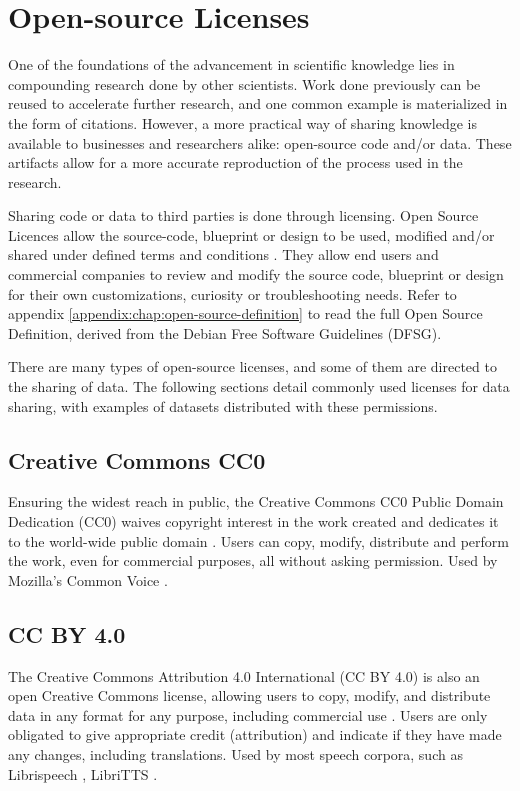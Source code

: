 \section{Open-source Licenses}

One of the foundations of the advancement in scientific knowledge lies in compounding research done by other scientists. Work done previously can be reused to accelerate further research, and one common example is materialized in the form of citations. However, a more practical way of sharing knowledge is available to businesses and researchers alike: open-source code and/or data. These artifacts allow for a more accurate reproduction of the process used in the research.

Sharing code or data to third parties is done through licensing. Open Source Licences allow the source-code, blueprint or design to be used, modified and/or shared under defined terms and conditions \cite{perens1999open}. They allow end users and commercial companies to review and modify the source code, blueprint or design for their own customizations, curiosity or troubleshooting needs. Refer to appendix \ref{appendix:chap:open-source-definition} to read the full Open Source Definition, derived from the Debian Free Software Guidelines (DFSG).

There are many types of open-source licenses, and some of them are directed to the sharing of data. The following sections detail commonly used licenses for data sharing, with examples of datasets distributed with these permissions.

\subsection{Creative Commons CC0}

Ensuring the widest reach in public, the Creative Commons CC0 Public Domain Dedication (CC0) waives copyright interest in the work created and dedicates it to the world-wide public domain \cite{licenses-cc0}. Users can copy, modify, distribute and perform the work, even for commercial purposes, all without asking permission. Used by Mozilla's Common Voice \cite{ardila2019common}.

\subsection{CC BY 4.0}

The Creative Commons Attribution 4.0 International (CC BY 4.0) is also an open Creative Commons license, allowing users to copy, modify, and distribute data in any format for any purpose, including commercial use \cite{licenses-ccby40}. Users are only obligated to give appropriate credit (attribution) and indicate if they have made any changes, including translations. Used by most speech corpora, such as Librispeech \cite{panayotov2015librispeech}, LibriTTS \cite{zen2019libritts}.

